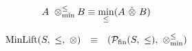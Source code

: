 
\[
  A\ \minlift B  \equiv   \min_\leq(A \ \hat{\otimes} \ B)
\] 

\[ 
\begin{array}{rcl} 
\mathrm{MinLift}(S,\ \leq,\ \otimes)
   & \equiv 
   & ({\cal P}_{\mathrm{fin}}(S,\ \leq),\ \mathbin{\otimes_{\min}^{\leq}})
\end{array} 
\]

